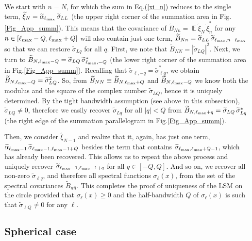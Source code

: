 \documentclass[12pt]{article}
\DeclareMathOperator{\Ex}{\mathbb{E}}
\begin{document}
We start with  $n=N$, for which the sum in Eq.(\ref{xi_n}) reduces to the single term,
$\widetilde\xi_N = \widetilde\alpha_{\ell_{\rm max}} \,\widetilde\sigma_{LL}$
(the upper right corner of the summation area in Fig.\ref{Fig_App_summ}).
This means that the covariance of  $\widetilde B_{Nn}=\Ex\widetilde\xi_N\,\widetilde\xi_n^*$ for any
$n \in [\ell_{\rm max}-Q, \ell_{\rm max}+Q]$ will also contain just one term,
$\widetilde B_{Nn} = \widetilde\sigma_{LL} \, \widetilde\sigma_{\ell_{\rm max},n-\ell_{\rm max}}$
 so that we can restore $\widetilde\sigma_{Lq}$ for all $q$.
First, we note that $\widetilde B_{NN} = |\widetilde\sigma_{LQ}|^2$.
Next, we turn to 
$\widetilde B_{N,\ell_{\rm max}-Q} = \widetilde\sigma_{LQ} \,\widetilde\sigma_{\ell_{\rm max},-Q}^*$
(the lower right corner  of the summation area in Fig.\ref{Fig_App_summ}).
Recalling that 
 $\widetilde\sigma_{\ell, -q} = \widetilde\sigma_{\ell q}^*$, we obtain
$\widetilde B_{N,\ell_{\rm max}-Q}=\widetilde\sigma_{LQ}^2$.
So, from $\widetilde B_{NN} \equiv \widetilde B_{N, \ell_{\rm max}+Q}$ and $\widetilde B_{N,\ell_{\rm max}-Q}$ we know both the modulus 
and the square of the complex number $\widetilde\sigma_{LQ}$, hence it is uniquely
determined. 
By the tight bandwidth assumption (see above in this subsection), 
$\widetilde\sigma_{LQ} \ne 0$, therefore we easily recover  
$\widetilde\sigma_{Lq}$ for all $|q|<Q$ from 
$\widetilde B_{N,\ell_{\rm max}+q} = \widetilde\sigma_{LQ} \,\widetilde\sigma_{Lq}^*$
(the right edge of the 
summation parallelogram in Fig.\ref{Fig_App_summ}).
 
Then, we consider $\widetilde\xi_{N-1}$ and realize that it, again, has just one term,
$\widetilde\alpha_{\ell_{\rm max}-1} \,\widetilde\sigma_{\ell_{\rm max}-1,\ell_{\rm max}-1+Q}$ besides the term that contains 
$\widetilde\sigma_{\ell_{\rm max},\ell_{\rm max}+Q-1}$, which has already been recovered. This allows us to repeat the above process
and uniquely recover $\widetilde\sigma_{\ell_{\rm max}-1,\ell_{\rm max}-1+q}$ for all $q\in[-Q,Q]$. 
And so on, we recover all non-zero $\widetilde\sigma_{\ell q}$,
and therefore all  spectral functions $\sigma_\ell(x)$, from the set of the spectral covariances $\widetilde B_{n \bar n}$.
This completes the proof of uniqueness of the LSM on the circle
provided that
 $\sigma_\ell(x) \ge 0$ 
and the half-bandwidth $Q$ of  $\sigma_\ell(x)$ is such that  $\widetilde\sigma_{\ell Q} \ne 0$ for any $\ell$.




\subsection{Spherical case}
\label{App_identif_sphe}
\end{document}
